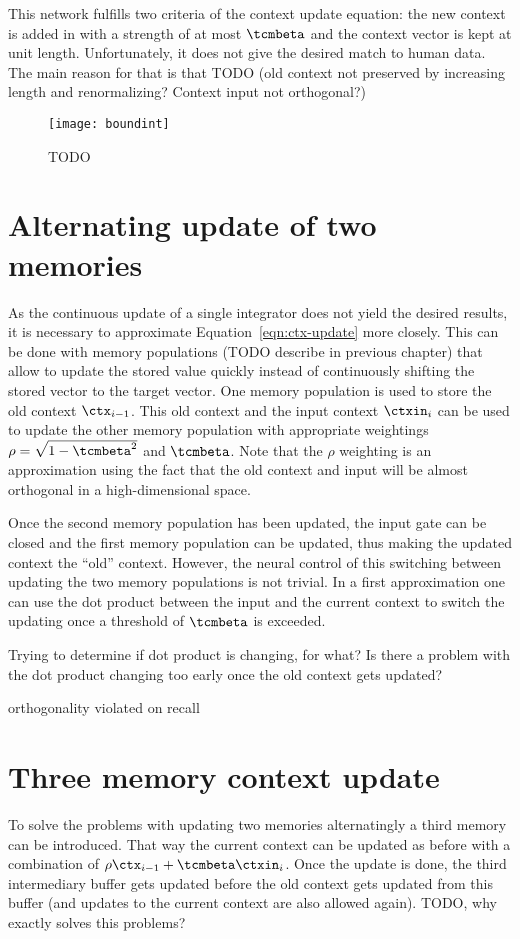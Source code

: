 This network fulfills two criteria of the context update equation: the new context is added in with a strength of at most $\tcmbeta$ and the context vector is kept at unit length.
Unfortunately, it does not give the desired match to human data.
The main reason for that is that TODO (old context not preserved by increasing length and renormalizing? Context input not orthogonal?)
\begin{figure}
    \centering
    \texttt{[image: boundint]}
    \caption{TODO}
\end{figure}

\section{Alternating update of two memories}
As the continuous update of a single integrator does not yield the desired results, it is necessary to approximate Equation~\ref{eqn:ctx-update} more closely.
This can be done with memory populations (TODO describe in previous chapter) that allow to update the stored value quickly instead of continuously shifting the stored vector to the target vector.
One memory population is used to store the old context $\ctx_{i-1}$.
This old context and the input context $\ctxin_i$ can be used to update the other memory population with appropriate weightings $\rho = \sqrt{1 - \tcmbeta^2}$ and $\tcmbeta$.
Note that the $\rho$ weighting is an approximation using the fact that the old context and input will be almost orthogonal in a high-dimensional space.

Once the second memory population has been updated, the input gate can be closed and the first memory population can be updated, thus making the updated context the ``old'' context.
However, the neural control of this switching between updating the two memory populations is not trivial.
In a first approximation one can use the dot product between the input and the current context to switch the updating once a threshold of $\tcmbeta$ is exceeded.

Trying to determine if dot product is changing, for what?
Is there a problem with the dot product changing too early once the old context gets updated?

orthogonality violated on recall

\section{Three memory context update}
To solve the problems with updating two memories alternatingly a third memory can be introduced.
That way the current context can be updated as before with a combination of $\rho \ctx_{i-1} + \tcmbeta \ctxin_i$.
Once the update is done, the third intermediary buffer gets updated before the old context gets updated from this buffer (and updates to the current context are also allowed again). TODO, why exactly solves this problems?

